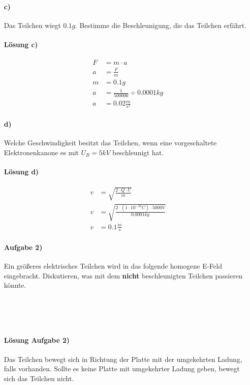 \documentclass[12pt,a4paper]{report}
\begin{document}
	\paragraph{c)} Das Teilchen wiegt $0.1g$. Bestimme die Beschleunigung, die das Teilchen erfährt.
	\paragraph{Lösung c)}
	\begin{align*}
	    F &= m \cdot a \\
	    a &= \frac{F}{m} \\
	    m &= 0.1g \\
	    a &= \frac{1}{500000} \div 0.0001 kg \\
	    a &= 0.02 \frac{m}{s^2}
	\end{align*}
	\paragraph{d)} Welche Geschwindigkeit besitzt das Teilchen, wenn eine vorgeschaltete Elektronenkanone es mit $U_B = 5kV$ beschleunigt hat.
	\paragraph{Lösung d)}
	\begin{align*}
	    v &= \sqrt{\frac{2\cdot Q\cdot U}{m}} \\
	    v &= \sqrt{\frac{2\cdot (1\cdot 10^{-10}C)\cdot 5000V}{0.0001 kg}} \\
	    v &= 0.1\frac{m}{s}
	\end{align*}
	\paragraph{Aufgabe 2)} Ein \dq größeres elektrisches Teilchen wird in das folgende homogene E-Feld eingebracht. Diskutieren, was mit dem \textbf{nicht} beschleunigten Teilchen passieren könnte. 
	\\\\
	\\\\
	\paragraph{Lösung Aufgabe 2)} Das Teilchen bewegt sich in Richtung der Platte mit der umgekehrten Ladung, falls vorhanden. Sollte es keine Platte mit umgekehrter Ladung geben, bewegt sich das Teilchen nicht.
\end{document}
